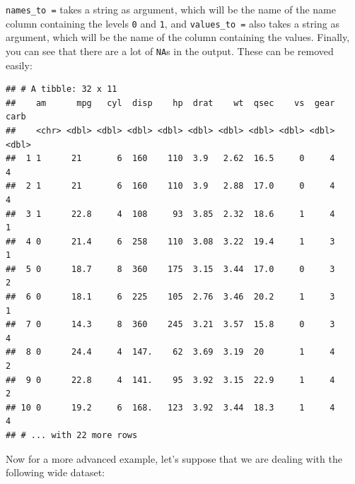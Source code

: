 \documentclass[]{gitbook}
\newenvironment{Shaded}{\begin{snugshade}}{\end{snugshade}}
\newcommand{\DataTypeTok}[1]{\textcolor[rgb]{0.13,0.29,0.53}{#1}}
\newcommand{\KeywordTok}[1]{\textcolor[rgb]{0.13,0.29,0.53}{\textbf{#1}}}
\newcommand{\NormalTok}[1]{#1}
\newcommand{\OperatorTok}[1]{\textcolor[rgb]{0.81,0.36,0.00}{\textbf{#1}}}
\newcommand{\OtherTok}[1]{\textcolor[rgb]{0.56,0.35,0.01}{#1}}
\newcommand{\StringTok}[1]{\textcolor[rgb]{0.31,0.60,0.02}{#1}}
\begin{document}
\texttt{names\_to\ =} takes a string as argument, which will be the name of the name column containing the
levels \texttt{0} and \texttt{1}, and \texttt{values\_to\ =} also takes a string as argument, which will be the name of
the column containing the values. Finally, you can see that there are a lot of \texttt{NA}s in the
output. These can be removed easily:

\begin{Shaded}
\end{Shaded}

\begin{verbatim}
## # A tibble: 32 x 11
##    am      mpg   cyl  disp    hp  drat    wt  qsec    vs  gear  carb
##    <chr> <dbl> <dbl> <dbl> <dbl> <dbl> <dbl> <dbl> <dbl> <dbl> <dbl>
##  1 1      21       6  160    110  3.9   2.62  16.5     0     4     4
##  2 1      21       6  160    110  3.9   2.88  17.0     0     4     4
##  3 1      22.8     4  108     93  3.85  2.32  18.6     1     4     1
##  4 0      21.4     6  258    110  3.08  3.22  19.4     1     3     1
##  5 0      18.7     8  360    175  3.15  3.44  17.0     0     3     2
##  6 0      18.1     6  225    105  2.76  3.46  20.2     1     3     1
##  7 0      14.3     8  360    245  3.21  3.57  15.8     0     3     4
##  8 0      24.4     4  147.    62  3.69  3.19  20       1     4     2
##  9 0      22.8     4  141.    95  3.92  3.15  22.9     1     4     2
## 10 0      19.2     6  168.   123  3.92  3.44  18.3     1     4     4
## # ... with 22 more rows
\end{verbatim}

Now for a more advanced example, let's suppose that we are dealing with the following wide dataset:

\begin{Shaded}
\end{Shaded}
\end{document}
